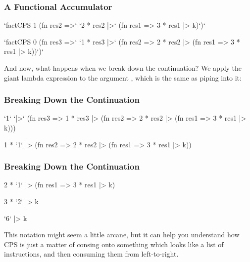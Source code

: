 \documentclass[aspectratio=169, handout]{beamer}
\begin{document}
\begin{frame}[fragile]
  \frametitle{A Functional Accumulator}

  \begin{codeblock}
    `factCPS 1    (fn res2 =>`
    `2 * res2  |>` (fn res1 =>
    3 * res1  |> k)`)`
  \end{codeblock}

  \pause
  \vspace{\fill}

  \begin{codeblock}
    `factCPS 0    (fn res3 =>`
    `1 * res3  |>` (fn res2 =>
    2 * res2  |> (fn res1 =>
    3 * res1  |> k))`)`
  \end{codeblock}

  And now, what happens when we break down the continuation? We apply the
  giant lambda expression to the argument , which is the same as
  piping  into it:
\end{frame}

\begin{frame}[fragile]
  \frametitle{Breaking Down the Continuation}

  \begin{codeblock}
    `1`         `|>` (fn res3 =>
    1 * res3  |> (fn res2 =>
    2 * res2  |> (fn res1 =>
    3 * res1  |> k)))
  \end{codeblock}

  \pause
  \vspace{\fill}

  \begin{codeblock}
    1 * `1`     |> (fn res2 =>
    2 * res2  |> (fn res1 =>
    3 * res1  |> k))
  \end{codeblock}
\end{frame}

\begin{frame}[fragile]
  \frametitle{Breaking Down the Continuation}

  \begin{codeblock}
    2 * `1`     |> (fn res1 =>
    3 * res1  |> k)
  \end{codeblock}

  \pause
  \vspace{\fill}

  \begin{codeblock}
    3 * `2`     |> k
  \end{codeblock}

  \pause
  \vspace{\fill}

  \begin{codeblock}
    `6`         |> k
  \end{codeblock}

  \pause
  \vspace{\fill}

  This notation might seem a little arcane, but it can help you understand how
  CPS is just a matter of consing onto something which looks like a list of
  instructions, and then consuming them from left-to-right.
\end{frame}
\end{document}
